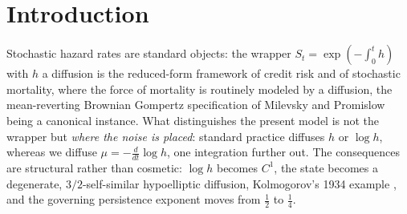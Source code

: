 \begin{abstract}
\end{abstract}

\section{Introduction}\label{sec:intro}

Stochastic hazard rates are standard objects: the wrapper
$S_t=\exp(-\int_0^t h)$ with $h$ a diffusion is the reduced-form
framework of credit risk \cite{Lan04} and of stochastic mortality,
where the force of mortality is routinely modeled by a diffusion, the
mean-reverting Brownian Gompertz specification of Milevsky and
Promislow \cite{MP01} being a canonical instance. What distinguishes
the present model is not the wrapper but \emph{where the noise is
placed}: standard practice diffuses $h$ or $\log h$, whereas we diffuse
$\mu=-\tfrac{d}{dt}\log h$, one integration further out. The
consequences are structural rather than cosmetic: $\log h$ becomes
$C^1$, the state becomes a degenerate, $3/2$-self-similar hypoelliptic
diffusion, Kolmogorov's 1934 example \cite{Kol34,Hor67}, and the
governing persistence exponent moves from $\tfrac12$ to $\tfrac14$.

